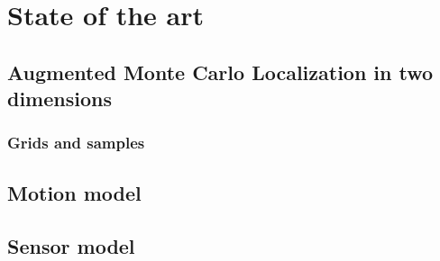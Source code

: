 \documentclass[Thesis.tex]{subfiles}
\begin{document}
\chapter{State of the art}
\section{Augmented Monte Carlo Localization in two dimensions}

\subsection{Grids and samples}

\section{Motion model}

\section{Sensor model}
\end{document}

